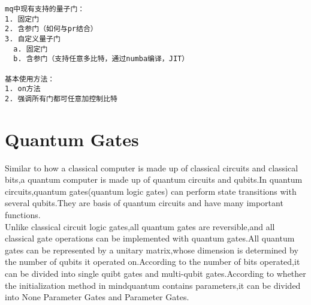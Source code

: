 \begin{lstlisting}
mq中现有支持的量子门：
1. 固定门
2. 含参门（如何与pr结合）
3. 自定义量子门
  a. 固定门
  b. 含参门（支持任意多比特，通过numba编译，JIT）

基本使用方法：
1. on方法
2. 强调所有门都可任意加控制比特
\end{lstlisting}




\maketitle

\section{Quantum Gates}
Similar to how a classical computer is made up of classical circuits and classical bits,a quantum computer is made up of quantum circuits and qubits.In quantum circuits,quantum gates(quantum logic gates) can perform state transitions with several qubits.They are basis of quantum circuits and have many important functions.\\
Unlike classical circuit logic gates,all quantum gates are reversible,and all classical gate operations can be implemented with quantum gates.All quantum gates can be represented by a unitary matrix,whose dimension is determined by the number of qubits it operated on.According to the number of bits operated,it can be divided into single quibt gates and multi-qubit gates.According to whether the initialization method in mindquantum contains parameters,it can be divided into None Parameter Gates and Parameter Gates.

